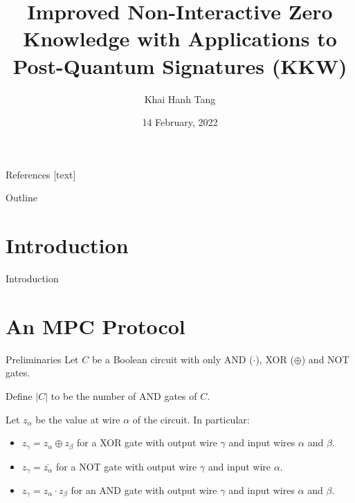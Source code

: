 \documentclass{beamer}
\title{Improved Non-Interactive Zero Knowledge with Applications to Post-Quantum Signatures (KKW)}
\author{Khai Hanh Tang}
\date{14 February, 2022}
\begin{document}
	
	\begin{frame}
		\titlepage
	\end{frame}
	
	\begin{frame}{References}
		
		
		
	\end{frame}
	
	\begin{frame}{Outline}
		\tableofcontents
		
	\end{frame}
	
	\section{Introduction}
	\begin{frame}{Introduction}
		
	\end{frame}
	
	\section{An MPC Protocol}
	\begin{frame}{Preliminaries}
		Let $C$ be a Boolean circuit with only AND ($\cdot$), XOR ($\oplus$) and NOT gates. 
		
		Define $\vert C \vert$ to be the number of AND gates of $C$.
		
		Let $z_\alpha$ be the value at wire $\alpha$ of the circuit. In particular:
		\begin{itemize}
			\item $z_\gamma = z_\alpha \oplus z_\beta$ for a XOR gate with output wire $\gamma$ and input wires $\alpha$ and $\beta$.
			\item $z_\gamma = \overline{z_\alpha}$ for a NOT gate with output wire $\gamma$ and input wire $\alpha$.
			\item $z_\gamma = z_\alpha \cdot z_\beta$ for an AND gate with output wire $\gamma$ and input wires $\alpha$ and $\beta$.
		\end{itemize}
	\end{frame}
\end{document}
